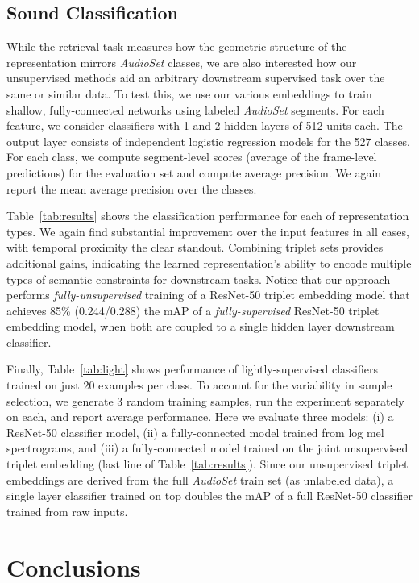 \documentclass{article}
\begin{document}
\subsection{Sound Classification}

While the retrieval task measures how the geometric structure of the
representation mirrors \emph{AudioSet} classes, we are also interested how our
unsupervised methods aid an arbitrary downstream supervised task over the same
or similar data.  To test this, we use our various embeddings to train shallow,
fully-connected networks using labeled \emph{AudioSet} segments.  For each
feature, we consider classifiers with 1 and 2 hidden layers of 512 units each.
The output layer consists of independent logistic regression models for the 527
classes.  For each class, we compute segment-level scores (average of the
frame-level predictions) for the evaluation set and compute average precision.
We again report the mean average precision over the classes.

Table~\ref{tab:results} shows the classification performance for each of
representation types. We again find substantial improvement over the input
features in all cases, with temporal proximity the clear standout.  Combining
triplet sets provides additional gains, indicating the learned representation's
ability to encode multiple types of semantic constraints for downstream tasks.
Notice that our approach performs \emph{fully-unsupervised} training of a
ResNet-50 triplet embedding model that achieves 85\% (0.244/0.288) the mAP of a
\emph{fully-supervised} ResNet-50 triplet embedding model, when both are coupled
to a single hidden layer downstream classifier.

Finally, Table~\ref{tab:light} shows performance of lightly-supervised
classifiers trained on just 20 examples per class.  To account for the
variability in sample selection, we generate 3 random training samples, run the
experiment separately on each, and report average performance.  Here we evaluate
three models: (i) a ResNet-50 classifier model, (ii) a fully-connected model
trained from log mel spectrograms, and (iii) a fully-connected model trained on
the joint unsupervised triplet embedding (last line of
Table~\ref{tab:results}). Since our unsupervised triplet embeddings are derived
from the full \emph{AudioSet} train set (as unlabeled data), a single layer
classifier trained on top doubles the mAP of a full ResNet-50 classifier trained
from raw inputs.



\section{Conclusions}
\end{document}
